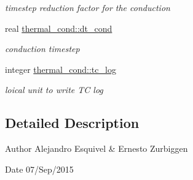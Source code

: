 \begin{DoxyCompactItemize}
\begin{DoxyCompactList}\small\item\em timestep reduction factor for the conduction \end{DoxyCompactList}\item 
\hypertarget{namespacethermal__cond_a0d692500ab9d6becafcf89d733d3f76f}{}real \hyperlink{namespacethermal__cond_a0d692500ab9d6becafcf89d733d3f76f}{thermal\+\_\+cond\+::dt\+\_\+cond}\label{namespacethermal__cond_a0d692500ab9d6becafcf89d733d3f76f}

\begin{DoxyCompactList}\small\item\em conduction timestep \end{DoxyCompactList}\item 
\hypertarget{namespacethermal__cond_a03140c73c7461f1882cd286b3e378abc}{}integer \hyperlink{namespacethermal__cond_a03140c73c7461f1882cd286b3e378abc}{thermal\+\_\+cond\+::tc\+\_\+log}\label{namespacethermal__cond_a03140c73c7461f1882cd286b3e378abc}

\begin{DoxyCompactList}\small\item\em loical unit to write T\+C log \end{DoxyCompactList}\end{DoxyCompactItemize}


\subsection{Detailed Description}
\begin{DoxyAuthor}{Author}
Alejandro Esquivel \& Ernesto Zurbiggen 
\end{DoxyAuthor}
\begin{DoxyDate}{Date}
07/\+Sep/2015 
\end{DoxyDate}
